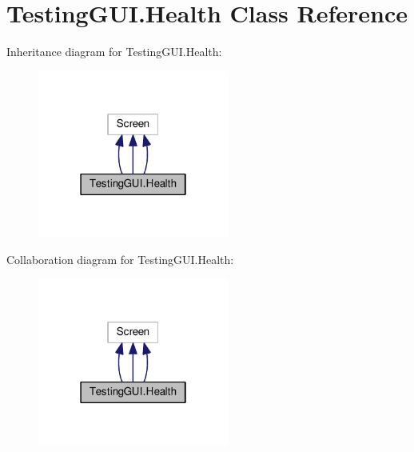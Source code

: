 \hypertarget{classTestingGUI_1_1Health}{}\section{Testing\+G\+U\+I.\+Health Class Reference}
\label{classTestingGUI_1_1Health}


Inheritance diagram for Testing\+G\+U\+I.\+Health\+:
\nopagebreak
\begin{figure}[H]
\begin{center}
\leavevmode
\includegraphics[width=178pt]{classTestingGUI_1_1Health__inherit__graph}
\end{center}
\end{figure}


Collaboration diagram for Testing\+G\+U\+I.\+Health\+:
\nopagebreak
\begin{figure}[H]
\begin{center}
\leavevmode
\includegraphics[width=178pt]{classTestingGUI_1_1Health__coll__graph}
\end{center}
\end{figure}
